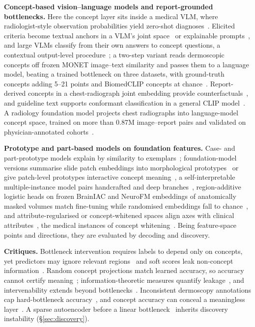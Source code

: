 \textbf{Concept-based vision--language models and report-grounded bottlenecks.} Here the concept layer
sits inside a medical VLM, where radiologist-style observation probabilities yield zero-shot
diagnoses~\cite{pellegrini2023xplainer}. Elicited criteria become textual anchors in a VLM's joint
space~\cite{gao2024aligning} or explainable prompts~\cite{bie2024xcoop}, and large VLMs classify from
their own answers to concept questions, a contextual output-level procedure~\cite{patricio2025cbvlm}; a two-step
variant reads dermoscopic concepts off frozen MONET image--text similarity and passes them to a language model,
beating a trained bottleneck on three datasets, with ground-truth concepts adding 5--21 points and BiomedCLIP concepts
at chance~\cite{patricio2025twostep}. Report-derived concepts
in a chest-radiograph joint embedding provide counterfactuals~\cite{sadashivaiah2024explaining}, and
guideline text supports conformant classification in a general CLIP model~\cite{harmanani2026vision}. A radiology foundation model projects chest radiographs into
language-model concept space, trained on more than 0.87M image--report pairs and validated on
physician-annotated cohorts~\cite{han2026clear}.

\textbf{Prototype and part-based models on foundation features.} Case- and part-prototype models explain by
similarity to exemplars~\cite{chen2019thislooks,barnett2021case,kim2021xprotonet}; foundation-model versions
summarise slide patch embeddings into morphological prototypes~\cite{song2024morphological} or
give patch-level prototypes interactive concept meaning~\cite{huy2025interactive}, a self-interpretable
multiple-instance model pairs handcrafted and deep branches~\cite{kapse2023si}, region-additive logistic heads on
frozen BrainIAC and NeuroFM embeddings of anatomically masked volumes match fine-tuning while randomised
embeddings fall to chance~\cite{zhang2026regionfm}, and
attribute-regularised or concept-whitened spaces align axes with clinical
attributes~\cite{cetin2022attri,hou2024concept}, the medical instances of concept whitening~\cite{chen2020concept}. Being feature-space
points and directions, they are evaluated by decoding and discovery.

\textbf{Critiques.} Bottleneck intervention requires labels to depend only on concepts, yet predictors may
ignore relevant regions~\cite{margeloiu2021do} and soft scores leak non-concept information~\cite{havasi2022addressing}. Random concept projections match learned accuracy, so
accuracy cannot certify meaning~\cite{srivastava2024vlg,schmalwasser2026faithfulness};
information-theoretic measures quantify leakage~\cite{parisini2025leakage,makonnen2025measuring}, and
intervenability extends beyond bottlenecks~\cite{marcinkevics2024beyond}. Inconsistent dermoscopy annotations cap
hard-bottleneck accuracy~\cite{napoles2026concept}, and concept accuracy can
conceal a meaningless layer~\cite{han2026loss}. A sparse autoencoder before a linear
bottleneck~\cite{rao2024discover} inherits discovery instability
(\S\ref{sec:discovery}).


